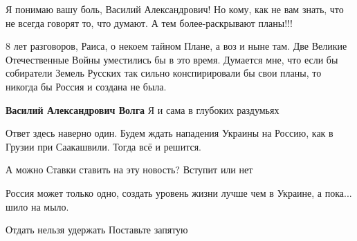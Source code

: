 \begin{itemize}

Я понимаю вашу боль, Василий Александрович! Но кому, как не вам знать, что не
всегда говорят то, что думают. А тем более-раскрывают планы!!!

\begin{itemize} %
8 лет разговоров, Раиса, о некоем тайном Плане, а воз и ныне там. Две Великие Отечественные Войны уместились бы в это время. Думается мне, что если бы собиратели Земель Русских так сильно конспирировали бы свои планы, то никогда бы Россия и создана не была.

\textbf{Василий Александрович Волга}
Я и сама в глубоких раздумьях
\end{itemize} %

Ответ здесь наверно один. Будем ждать нападения Украины на Россию, как в Грузии при Саакашвили. Тогда всё и решится.

А можно Ставки ставить на эту новость? Вступит или нет

Россия может только одно, создать уровень жизни лучше чем в Украине, а пока... шило на мыло.

Отдать нельзя удержать
Поставьте запятую

\end{itemize} %
